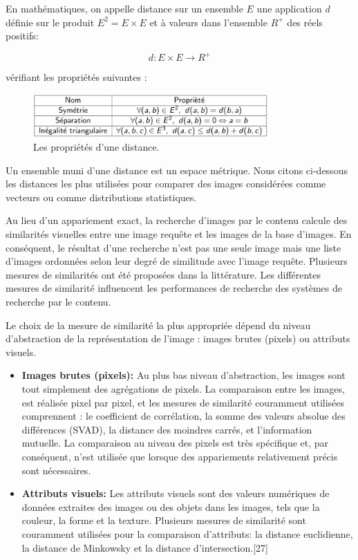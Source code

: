 En mathématiques, on appelle distance sur un ensemble $E$ une application $d$ définie sur le produit $E^2 = E \times E$ et à valeurs dans l'ensemble $R^+$ des réels positifs:

\begin{equation}
	d: E \times E \rightarrow R^+
\end{equation}

vérifiant les propriétés suivantes :
\begin{figure}[H]
	\centering
	\includegraphics[width=0.8\textwidth]{Figures/distanceProp.png} %
	\caption{Les propriétés d'une distance.}
\end{figure}


Un ensemble muni d'une distance est un espace métrique. Nous citons ci-dessous les distances les plus utilisées pour comparer des images considérées comme vecteurs ou comme distributions statistiques.

Au lieu d'un appariement exact, la recherche d’images par le contenu calcule des similarités visuelles entre une image requête et les images de la base d'images. En conséquent, le résultat d'une recherche n'est pas une seule image mais une liste d'images ordonnées selon leur degré de similitude avec l'image requête. Plusieurs mesures de similarités ont été proposées dans la littérature. Les différentes mesures de similarité influencent les performances de recherche des systèmes de recherche par le contenu.

Le choix de la mesure de similarité la plus appropriée dépend du niveau d'abstraction de la
représentation de l'image : images brutes (pixels) ou attributs visuels.
\begin{itemize}
	\item \textbf{Images brutes (pixels): }Au plus bas niveau d'abstraction, les images sont tout simplement des agrégations de pixels.
	La comparaison entre les images, est réalisée pixel par pixel, et les mesures de similarité
	couramment utilisées comprennent : le coefficient de corrélation, la somme des valeurs
	absolue des différences (SVAD), la distance des moindres carrés, et l’information mutuelle.
	La comparaison au niveau des pixels est très spécifique et, par conséquent, n'est utilisée que lorsque des appariements relativement précis sont nécessaires.
	
	\item \textbf{Attributs visuels:} Les attributs visuels sont des valeurs numériques de données extraites des images ou des objets dans les images, tels que la couleur, la forme et la texture. Plusieurs mesures de similarité sont couramment utilisées pour la comparaison d’attributs: la distance euclidienne, la distance de Minkowsky et la distance d’intersection.[27]
\end{itemize}

